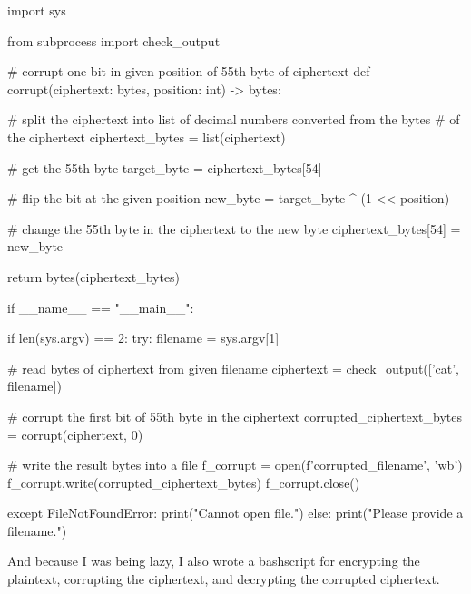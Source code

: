 \documentclass{article}
\begin{document}
\begin{python}
import sys

from subprocess import check_output


# corrupt one bit in given position of 55th byte of ciphertext
def corrupt(ciphertext: bytes, position: int) -> bytes:

    # split the ciphertext into list of decimal numbers converted from the bytes
    # of the ciphertext
    ciphertext_bytes = list(ciphertext)

    # get the 55th byte
    target_byte = ciphertext_bytes[54]

    # flip the bit at the given position
    new_byte = target_byte ^ (1 << position)

    # change the 55th byte in the ciphertext to the new byte
    ciphertext_bytes[54] = new_byte

    return bytes(ciphertext_bytes)


if __name__ == "__main__":

    if len(sys.argv) == 2:
        try:
            filename = sys.argv[1]

            # read bytes of ciphertext from given filename
            ciphertext = check_output(['cat', filename])

            # corrupt the first bit of 55th byte in the ciphertext
            corrupted_ciphertext_bytes = corrupt(ciphertext, 0)

            # write the result bytes into a file
            f_corrupt = open(f'corrupted_{filename}', 'wb')
            f_corrupt.write(corrupted_ciphertext_bytes)
            f_corrupt.close()

        except FileNotFoundError:
            print("Cannot open file.")
    else:
        print("Please provide a filename.")
\end{python}

And because I was being lazy, I also wrote a bashscript for encrypting the plaintext,
corrupting the ciphertext, and decrypting the corrupted ciphertext.

\end{document}
